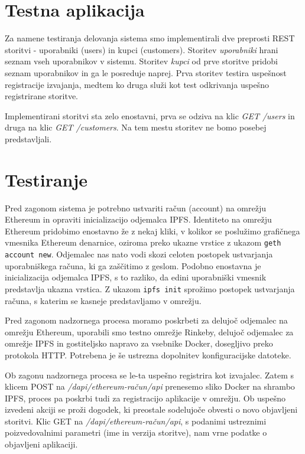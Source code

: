 \documentclass[a4paper, 12pt]{book}
\begin{document}
\section{Testna aplikacija}

Za namene testiranja delovanja sistema smo implementirali dve preprosti REST storitvi - uporabniki (users) in kupci (customers).
Storitev \textit{uporabniki} hrani seznam vseh uporabnikov v sistemu.
Storitev \textit{kupci} od prve storitve pridobi seznam uporabnikov in ga le posreduje naprej.
Prva storitev testira uspešnost registracije izvajanja, medtem ko druga služi kot test odkrivanja uspešno registrirane storitve.

Implementirani storitvi sta zelo enostavni, prva se odziva na klic \textit{GET /users} in druga na klic \textit{GET /customers}.
Na tem mestu storitev ne bomo posebej predstavljali.

\section{Testiranje}
Pred zagonom sistema je potrebno ustvariti račun (account) na omrežju Ethereum in opraviti inicializacijo odjemalca IPFS.
Identiteto na omrežju Ethereum pridobimo enostavno že z nekaj kliki, v kolikor se poslužimo grafičnega vmesnika Ethereum denarnice, oziroma preko ukazne vrstice z ukazom \texttt{geth account new}.
Odjemalec nas nato vodi skozi celoten postopek ustvarjanja uporabniškega računa, ki ga zaščitimo z geslom.
Podobno enostavna je inicializacija odjemalca IPFS, s to razliko, da edini uporabniški vmesnik predstavlja ukazna vrstica.
Z ukazom \texttt{ipfs init} sprožimo postopek ustvarjanja računa, s katerim se kasneje predstavljamo v omrežju.

Pred zagonom nadzornega procesa moramo poskrbeti za delujoč odjemalec na omrežju Ethereum, uporabili smo testno omrežje Rinkeby, delujoč odjemalec za omrežje IPFS in gostiteljsko napravo za vsebnike Docker, dosegljivo preko protokola HTTP.
Potrebena je še ustrezna dopolnitev konfiguracijske datoteke.

Ob zagonu nadzornega procesa se le-ta uspešno registrira kot izvajalec.
Zatem s klicem POST na \textit{/dapi/{ethereum-račun}/api} prenesemo sliko Docker na shrambo IPFS, proces pa poskrbi tudi za registracijo aplikacije v omrežju.
Ob uspešno izvedeni akciji se proži dogodek, ki preostale sodelujoče obvesti o novo objavljeni storitvi.
Klic GET na \textit{/dapi/{ethereum-račun}/api}, s podanimi ustreznimi poizvedovalnimi parametri (ime in verzija storitve), nam vrne podatke o objavljeni aplikaciji.
\end{document}
